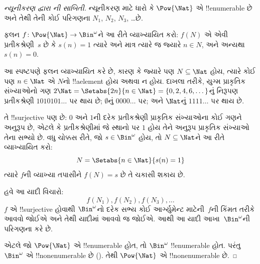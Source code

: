 \documentclass[../../../include/open-logic-section]{subfiles}
\begin{document}
\begin{proof}[ન્યૂનીકરણ દ્વારા {}ની સાબિતી]
ન્યૂનીકરણ માટે ધારો કે $\Pow{\Nat}$ એ !!{enumerable} છે અને તેથી
તેની કોઈ પરિગણના $N_{1}$, $N_{2}$, $N_{3}$, \dots છે.

ફલન $f \colon \Pow{\Nat} \to \Bin^\omega$ને આ રીતે વ્યાખ્યાયિત
કરો: $f(N)$ એ એવી પ્રતીકશ્રેણી~$s$ છે કે $s(n) = 1$ ત્યારે અને
માત્ર ત્યારે જ જ્યારે $n \in N$, અને અન્યથા $s(n) = 0$.

આ સ્પષ્ટપણે ફલન વ્યાખ્યાયિત કરે છે, કારણ કે જ્યારે પણ
$N \subseteq \Nat$ હોય, ત્યારે કોઈ પણ $n \in \Nat$ એ $N$નો
!!a{element} હોય અથવા ન હોય. દાખલા તરીકે, યુગ્મ પ્રાકૃતિક સંખ્યાઓનો
ગણ $2\Nat = \Setabs{2n}{n \in \Nat} = \{0,2, 4, 6,
\dots\}$નું નિરૂપણ પ્રતીકશ્રેણી $1010101\dots$ પર થાય છે;
$\emptyset$નું $0000\dots$ પર; અને $\Nat$નું $1111\dots$ પર થાય છે.

તે !!{surjective} પણ છે: $0$ અને $1$ની દરેક પ્રતીકશ્રેણી પ્રાકૃતિક
સંખ્યાઓના કોઈ ગણને અનુરૂપ છે, એટલે કે પ્રતીકશ્રેણીમાં જે સ્થાનો પર
$1$ હોય તેને અનુરૂપ પ્રાકૃતિક સંખ્યાઓ તેના સભ્યો છે. વધુ ચોક્કસ રીતે,
જો $s \in \Bin^\omega$ હોય, તો $N \subseteq \Nat$ને આ રીતે
વ્યાખ્યાયિત કરો:
\[
N = \Setabs{n \in \Nat}{s(n) = 1}
\]
ત્યારે $f$ની વ્યાખ્યા તપાસીને $f(N) = s$ છે તે ચકાસી શકાય છે.

હવે આ યાદી વિચારો:
\[
f(N_1), f(N_2), f(N_3), \dots
\]
$f$ એ !!{surjective} હોવાથી $\Bin^\omega$નો દરેક સભ્ય કોઈ
આર્ગ્યુમેન્ટ માટેની~$f$ની કિંમત તરીકે આવવો જોઈએ અને તેથી યાદીમાં આવવો જ
જોઈએ. આથી આ યાદી આખા~$\Bin^\omega$ની પરિગણના કરે છે.

એટલે જો $\Pow{\Nat}$ એ !!{enumerable} હોત, તો $\Bin^\omega$
!!{enumerable} હોત. પરંતુ $\Bin^\omega$ એ !!{nonenumerable} છે
(). તેથી $\Pow{\Nat}$ એ
!!{nonenumerable} છે.
\end{proof}

\end{document}
